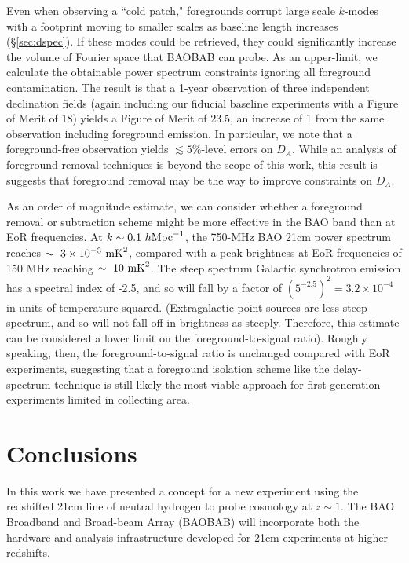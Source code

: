 \documentclass[10pt,iop]{emulateapj}
\begin{document}
Even when observing a ``cold patch," foregrounds corrupt large scale $k$-modes with a 
footprint moving to smaller scales as baseline length increases (\S\ref{sec:dspec}).  If these
modes could be retrieved, they could significantly increase the volume of Fourier space
that BAOBAB can probe.  As an upper-limit, we calculate the obtainable power spectrum constraints 
ignoring all foreground contamination.  The result is that a 1-year observation of
three independent declination fields
(again including our fiducial baseline experiments with a Figure of Merit of 18) yields a Figure
of Merit of 23.5, an increase of 1 from the same observation including foreground emission.  
In particular, we note that a foreground-free observation yields
$\lesssim5\%$-level errors on $D_A$.  While
an analysis of foreground removal techniques is beyond the scope of this work, this result is
suggests that foreground removal may be the way to improve constraints on $D_A$.

As an order of magnitude estimate, we can  consider whether a foreground removal or
subtraction scheme might be more effective in the BAO band than at EoR frequencies.  At 
$k\sim0.1~h\rm{Mpc}^{-1}$, the 750-MHz BAO 21cm power spectrum reaches $\sim~3\times10^{-3}~\rm{mK}^2$,
compared with a peak brightness at EoR frequencies of 150 MHz reaching $\sim~10~\rm{mK}^2$.  
The steep spectrum Galactic synchrotron emission has a spectral index of -2.5, and so will fall
by a factor of $(5^{-2.5})^2 = 3.2\times10^{-4}$ in units of temperature squared.  (Extragalactic point sources are
less steep spectrum, and so will not fall off in brightness as steeply.  Therefore, this estimate
can be considered a lower limit on the foreground-to-signal ratio).  
Roughly speaking, then, the foreground-to-signal ratio is unchanged compared with EoR experiments,
suggesting
that a foreground isolation scheme like the delay-spectrum technique is still likely
the most viable approach for first-generation experiments limited in collecting area.


\section{Conclusions}
\label{sec:conclusions}

In this work we have presented a concept for a new experiment using the redshifted 21cm 
line of neutral hydrogen to probe cosmology at $z\sim1$.  The BAO Broadband and Broad-beam
Array (BAOBAB) will incorporate both the hardware and analysis infrastructure developed for
21cm experiments at higher redshifts.
\end{document}
